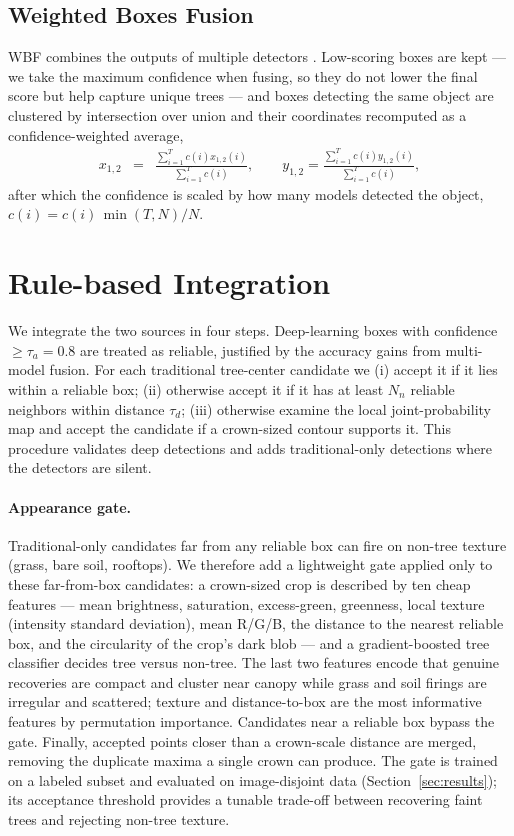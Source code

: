 \documentclass{article}
\begin{document}
\subsection{Weighted Boxes Fusion}
WBF combines the outputs of multiple detectors \cite{solovyev2021weighted}. Low-scoring boxes are kept --- we take the maximum confidence when fusing, so they do not lower the final score but help capture unique trees --- and boxes detecting the same object are clustered by intersection over union and their coordinates recomputed as a confidence-weighted average,
\begin{eqnarray}
  x_{1,2} &=& \frac{\sum_{i=1}^{T} c(i) x_{1,2}(i)}{\sum_{i=1}^{T} c(i)}, \qquad
  y_{1,2} = \frac{\sum_{i=1}^{T} c(i) y_{1,2}(i)}{\sum_{i=1}^{T} c(i)},
\end{eqnarray}
after which the confidence is scaled by how many models detected the object, $c(i) = c(i)\,\min(T,N)/N$.

\section{Rule-based Integration}\label{section:rule-based}

We integrate the two sources in four steps. Deep-learning boxes with confidence $\geq \tau_a = 0.8$ are treated as reliable, justified by the accuracy gains from multi-model fusion. For each traditional tree-center candidate we (i) accept it if it lies within a reliable box; (ii) otherwise accept it if it has at least $N_n$ reliable neighbors within distance $\tau_d$; (iii) otherwise examine the local joint-probability map and accept the candidate if a crown-sized contour supports it. This procedure validates deep detections and adds traditional-only detections where the detectors are silent.

\paragraph{Appearance gate.} Traditional-only candidates far from any reliable box can fire on non-tree texture (grass, bare soil, rooftops). We therefore add a lightweight gate applied only to these far-from-box candidates: a crown-sized crop is described by ten cheap features --- mean brightness, saturation, excess-green, greenness, local texture (intensity standard deviation), mean R/G/B, the distance to the nearest reliable box, and the circularity of the crop's dark blob --- and a gradient-boosted tree classifier decides tree versus non-tree. The last two features encode that genuine recoveries are compact and cluster near canopy while grass and soil firings are irregular and scattered; texture and distance-to-box are the most informative features by permutation importance. Candidates near a reliable box bypass the gate. Finally, accepted points closer than a crown-scale distance are merged, removing the duplicate maxima a single crown can produce. The gate is trained on a labeled subset and evaluated on image-disjoint data (Section~\ref{sec:results}); its acceptance threshold provides a tunable trade-off between recovering faint trees and rejecting non-tree texture.
\end{document}
